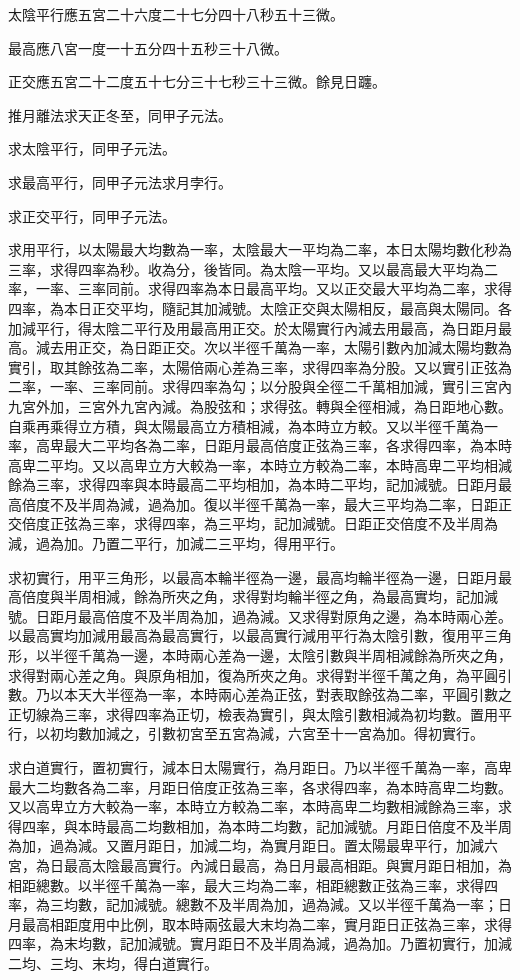 \begin{pinyinscope}
太陰平行應五宮二十六度二十七分四十八秒五十三微。

最高應八宮一度一十五分四十五秒三十八微。

正交應五宮二十二度五十七分三十七秒三十三微。餘見日躔。

推月離法求天正冬至，同甲子元法。

求太陰平行，同甲子元法。

求最高平行，同甲子元法求月孛行。

求正交平行，同甲子元法。

求用平行，以太陽最大均數為一率，太陰最大一平均為二率，本日太陽均數化秒為三率，求得四率為秒。收為分，後皆同。為太陰一平均。又以最高最大平均為二率，一率、三率同前。求得四率為本日最高平均。又以正交最大平均為二率，求得四率，為本日正交平均，隨記其加減號。太陰正交與太陽相反，最高與太陽同。各加減平行，得太陰二平行及用最高用正交。於太陽實行內減去用最高，為日距月最高。減去用正交，為日距正交。次以半徑千萬為一率，太陽引數內加減太陽均數為實引，取其餘弦為二率，太陽倍兩心差為三率，求得四率為分股。又以實引正弦為二率，一率、三率同前。求得四率為勾；以分股與全徑二千萬相加減，實引三宮內九宮外加，三宮外九宮內減。為股弦和；求得弦。轉與全徑相減，為日距地心數。自乘再乘得立方積，與太陽最高立方積相減，為本時立方較。又以半徑千萬為一率，高卑最大二平均各為二率，日距月最高倍度正弦為三率，各求得四率，為本時高卑二平均。又以高卑立方大較為一率，本時立方較為二率，本時高卑二平均相減餘為三率，求得四率與本時最高二平均相加，為本時二平均，記加減號。日距月最高倍度不及半周為減，過為加。復以半徑千萬為一率，最大三平均為二率，日距正交倍度正弦為三率，求得四率，為三平均，記加減號。日距正交倍度不及半周為減，過為加。乃置二平行，加減二三平均，得用平行。

求初實行，用平三角形，以最高本輪半徑為一邊，最高均輪半徑為一邊，日距月最高倍度與半周相減，餘為所夾之角，求得對均輪半徑之角，為最高實均，記加減號。日距月最高倍度不及半周為加，過為減。又求得對原角之邊，為本時兩心差。以最高實均加減用最高為最高實行，以最高實行減用平行為太陰引數，復用平三角形，以半徑千萬為一邊，本時兩心差為一邊，太陰引數與半周相減餘為所夾之角，求得對兩心差之角。與原角相加，復為所夾之角。求得對半徑千萬之角，為平圓引數。乃以本天大半徑為一率，本時兩心差為正弦，對表取餘弦為二率，平圓引數之正切線為三率，求得四率為正切，檢表為實引，與太陰引數相減為初均數。置用平行，以初均數加減之，引數初宮至五宮為減，六宮至十一宮為加。得初實行。

求白道實行，置初實行，減本日太陽實行，為月距日。乃以半徑千萬為一率，高卑最大二均數各為二率，月距日倍度正弦為三率，各求得四率，為本時高卑二均數。又以高卑立方大較為一率，本時立方較為二率，本時高卑二均數相減餘為三率，求得四率，與本時最高二均數相加，為本時二均數，記加減號。月距日倍度不及半周為加，過為減。又置月距日，加減二均，為實月距日。置太陽最卑平行，加減六宮，為日最高太陰最高實行。內減日最高，為日月最高相距。與實月距日相加，為相距總數。以半徑千萬為一率，最大三均為二率，相距總數正弦為三率，求得四率，為三均數，記加減號。總數不及半周為加，過為減。又以半徑千萬為一率；日月最高相距度用中比例，取本時兩弦最大末均為二率，實月距日正弦為三率，求得四率，為末均數，記加減號。實月距日不及半周為減，過為加。乃置初實行，加減二均、三均、末均，得白道實行。


\end{pinyinscope}

